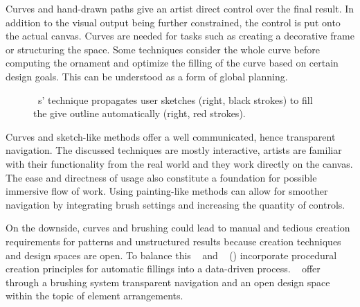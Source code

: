 Curves and hand-drawn paths give an artist direct control over the final result. In addition to the visual output being further constrained, the control is put onto the actual canvas. Curves are needed for tasks such as creating a decorative frame or structuring the space. Some techniques consider the whole curve before computing the ornament and optimize the filling of the curve based on certain design goals. This can be understood as a form of global planning. 

\begin{figure}[H]
    \centering
    \caption{\label{fig:xing_2014_apr}\citeauthor*{xing_2014_apr}~\cite{xing_2014_apr}s' technique propagates user sketches (right, black strokes) to fill the give outline automatically (right, red strokes).}
\end{figure}

Curves and sketch-like methods offer a well communicated, hence transparent navigation. The discussed techniques are mostly interactive, artists are familiar with their functionality from the real world and they work directly on the canvas. The ease and directness of usage also constitute a foundation for possible immersive flow of work. Using painting-like methods can allow for smoother navigation by integrating brush settings and increasing the quantity of controls. 

On the downside, curves and brushing could lead to manual and tedious creation requirements for patterns and unstructured results because creation techniques and design spaces are open. To balance this \citeauthor*{kazi_2012_vit}~\cite{kazi_2012_vit} and \citeauthor*{xing_2014_apr}~\cite{xing_2014_apr} () incorporate procedural creation principles for automatic fillings into a data-driven process. \citeauthor*{hsu_2020_aef}~\cite{hsu_2020_aef} offer through a brushing system transparent navigation and an open design space within the topic of element arrangements. 

